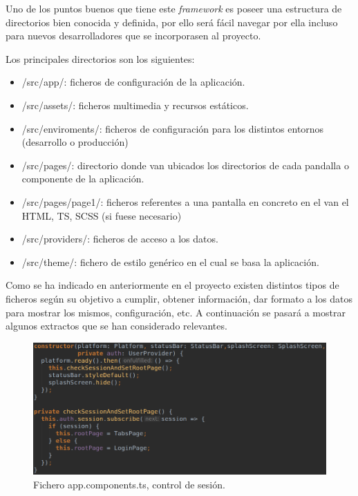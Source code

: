 Uno de los puntos buenos que tiene este \textit{framework} es
poseer una estructura de directorios bien conocida y definida,
por ello será fácil navegar por ella incluso para nuevos
desarrolladores que se incorporasen al proyecto.

\medskip
Los principales directorios son los siguientes:

\begin{itemize}
    \item /src/app/: ficheros de configuración de la aplicación.
    \item /src/assets/: ficheros multimedia y recursos estáticos.
    \item /src/enviroments/: ficheros de configuración para los
    distintos entornos (desarrollo o producción)
    \item /src/pages/: directorio donde van ubicados los directorios
    de cada pandalla o componente de la aplicación.
    \item /src/pages/page1/: ficheros referentes a una pantalla en
    concreto en el van el HTML, TS, SCSS (si fuese necesario)
    \item /src/providers/: ficheros de acceso a los datos.
    \item /src/theme/: fichero de estilo genérico en el cual
    se basa la aplicación.
\end{itemize}

\medskip
Como se ha indicado en anteriormente en el proyecto existen distintos
tipos de ficheros según su objetivo a cumplir, obtener información,
dar formato a los datos para mostrar los mismos, configuración, etc.
A continuación se pasará a mostrar algunos extractos que se han
considerado relevantes.

\begin{figure}
    \includegraphics[width=\linewidth]{./images/code/app-components-ts.png}
    \caption{Fichero app.components.ts, control de sesión.}
    \label{app.components.ts}
\end{figure}

